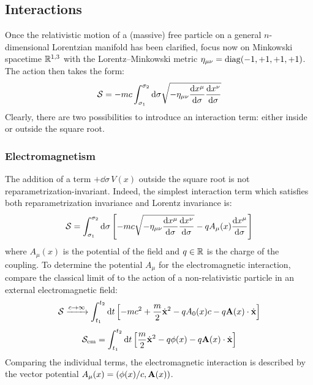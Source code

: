 
\subsection{Interactions}

Once the relativistic motion of a (massive) free particle on a general $ n $-dimensional Lorentzian manifold has been clarified, focus now on Minkowski spacetime $ \mathbb{R}^{1,3} $ with the Lorentz--Minkowski metric $ \eta_{\mu \nu} = \operatorname{diag}(-1,+1,+1,+1) $. The action then takes the form:
\begin{equation*}
  \mathcal{S} = - m c \int_{\sigma_1}^{\sigma_2} \mathrm{d} \sigma \sqrt{- \eta_{\mu \nu} \frac{\mathrm{d} x^\mu}{\mathrm{d} \sigma} \frac{\mathrm{d} x^\nu}{\mathrm{d} \sigma}}
\end{equation*}
Clearly, there are two possibilities to introduce an interaction term: either inside or outside the square root.

\subsubsection{Electromagnetism}

The addition of a term $ + \dd \sigma \, V(x) $ outside the square root is not reparametrization-invariant. Indeed, the simplest interaction term which satisfies both reparametrization invariance and Lorentz invariance is:
\begin{equation}
  \mathcal{S} = \int_{\sigma_1}^{\sigma_2} \mathrm{d} \sigma \left[ - m c \sqrt{- \eta_{\mu \nu} \frac{\mathrm{d} x^\mu}{\mathrm{d} \sigma} \frac{\mathrm{d} x^\nu}{\mathrm{d} \sigma}} - q A_\mu(x) \frac{\mathrm{d} x^\mu}{\mathrm{d} \sigma} \right]
  \label{eq:em-act}
\end{equation}
where $ A_\mu(x) $ is the potential of the field and $ q \in \mathbb{R} $ is the charge of the coupling. To determine the potential $ A_\mu $ for the electromagnetic interaction, compare the classical limit of  to the action of a non-relativistic particle in an external electromagnetic field:
\begin{equation*}
  \mathcal{S} \xrightarrow{c \rightarrow \infty} \int_{t_1}^{t_2} \mathrm{d} t \left[ - m c^2 + \frac{m}{2} \dot{\mathbf{x}}^2 - q A_0(x) c - q \mathbf{A}(x) \cdot \dot{\mathbf{x}} \right]
\end{equation*}
\begin{equation*}
  \mathcal{S}_\text{em} = \int_{t_1}^{t_2} \mathrm{d} t \left[ \frac{m}{2} \dot{\mathbf{x}}^2 - q \phi(x) - q \mathbf{A}(x) \cdot \dot{\mathbf{x}} \right]
\end{equation*}
Comparing the individual terms, the electromagnetic interaction is described by the vector potential $ A_\mu(x) = (\phi(x) / c , \mathbf{A}(x)) $.


